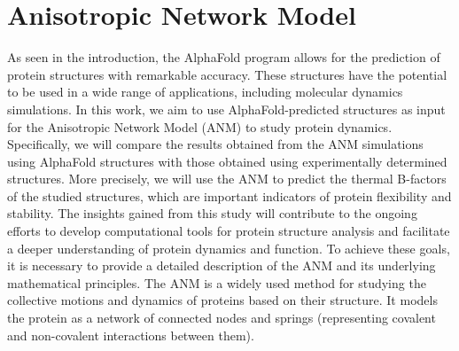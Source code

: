 \section{Anisotropic Network Model}
As seen in the introduction, the AlphaFold program allows for the prediction of protein structures with remarkable accuracy. These structures have the potential to be used in a wide range of applications, including molecular dynamics simulations. In this work, we aim to use AlphaFold-predicted structures as input for the Anisotropic Network Model (ANM) to study protein dynamics. Specifically, we will compare the results obtained from the ANM simulations using AlphaFold structures with those obtained using experimentally determined structures. More precisely, we will use the ANM to predict the thermal B-factors of the studied structures\cite{ANM-COM}, which are important indicators of protein flexibility and stability. The insights gained from this study will contribute to the ongoing efforts to develop computational tools for protein structure analysis and facilitate a deeper understanding of protein dynamics and function. To achieve these goals, it is necessary to provide a detailed description of the ANM and its underlying mathematical principles. The ANM is a widely used method for studying the collective motions and dynamics of proteins based on their structure. It models the protein as a network of connected nodes and springs (representing covalent and non-covalent interactions between them). 

